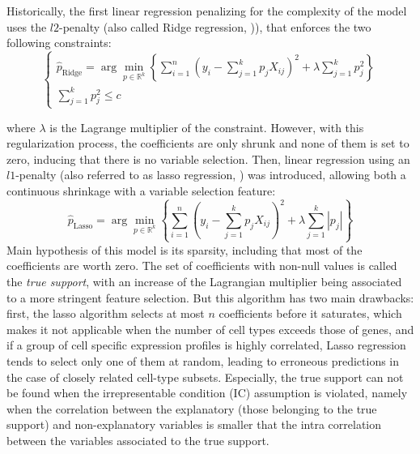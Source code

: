 Historically, the first linear regression penalizing for the complexity
of the model uses the \(l2\)-penalty (also called Ridge regression,
\autocite{hoerl_kennard70})),
that enforces the two following constraints: \[
\begin{cases}
\hat{p}_{\text{Ridge}}  =  \arg \min_{p \in \mathbb{R}^k} \left\{\sum_{i=1}^n \left( y_i - \sum_{j=1}^k p_j X_{ij}\right)^2 + \lambda \sum_{j=1}^k p_j^2 \right\} \\
\sum_{j=1}^k p_j^2 \le c
\end{cases}
\]

where \(\lambda\) is the Lagrange multiplier of the constraint. However,
with this regularization process, the coefficients are only shrunk and
none of them is set to zero, inducing that there is no variable
selection. Then, linear regression using an \(l1\)-penalty (also
referred to as lasso regression,
\autocite{tibshirani96}) was introduced,
allowing both a continuous shrinkage with a variable selection feature:
\[
\hat{p}_{\text{Lasso}}  =  \arg \min_{p \in \mathbb{R}^k} \left\{\sum_{i=1}^n \left( y_i - \sum_{j=1}^k p_j X_{ij}\right)^2 + \lambda \sum_{j=1}^k |p_j| \right\}
\] Main hypothesis of this model is its sparsity, including that most of
the coefficients are worth zero. The set of coefficients with non-null
values is called the \emph{true support}, with an increase of the
Lagrangian multiplier being associated to a more stringent feature
selection. But this algorithm has two main drawbacks: first, the lasso
algorithm selects at most \(n\) coefficients before it saturates, which
makes it not applicable when the number of cell types exceeds those of
genes, and if a group of cell specific expression profiles is highly
correlated, Lasso regression tends to select only one of them at random,
leading to erroneous predictions in the case of closely related
cell-type subsets. Especially, the true support can not be found when
the irrepresentable condition (IC) assumption is violated, namely when
the correlation between the explanatory (those belonging to the true
support) and non-explanatory variables is smaller that the intra
correlation between the variables associated to the true support.

